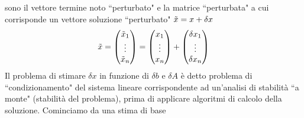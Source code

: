 \documentclass[12pt,a4paper]{article}
\begin{document}
sono il vettore termine noto ``perturbato" e la matrice ``perturbata" a cui corrisponde un vettore soluzione ``perturbato" $\Tilde{x}=x+\delta x$
\begin{equation*}
    \Tilde{x}= 
    \begin{pmatrix}
    \Tilde{x}_1\\  
    \vdots\\ 
    \Tilde{x}_n
\end{pmatrix} =
\begin{pmatrix}
    x_1\\  
    \vdots\\ 
    x_n
\end{pmatrix} + 
\begin{pmatrix}
    \delta x_1\\  
    \vdots\\ 
    \delta x_n
\end{pmatrix}
\end{equation*}
Il problema di stimare $\delta x$ in funzione di $\delta b$ e $\delta A$ è detto problema di ``condizionamento" del sistema lineare corrispondente ad un'analisi di stabilità ``a monte" (stabilità del problema), prima di applicare algoritmi di calcolo della soluzione.
Cominciamo da una stima di base
\end{document}
